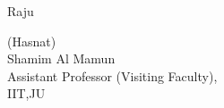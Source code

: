 
Raju


\bigskip
\bigskip
\bigskip

\noindent (Hasnat)
 \\
  Shamim Al Mamun \\ Assistant Professor (Visiting Faculty),  \\
  IIT,JU\\

